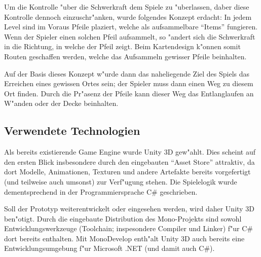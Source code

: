Um die Kontrolle "uber die Schwerkraft dem Spiele zu "uberlassen, daber diese
Kontrolle dennoch einzuschr"anken, wurde folgendes Konzept erdacht: In jedem
Level sind im Voraus Pfeile plaziert, welche als aufsammelbare ``Items''
fungieren. Wenn der Spieler einen solchen Pfeil aufsammelt, so "andert sich
die Schwerkraft in die Richtung, in welche der Pfeil zeigt. Beim Kartendesign
k"onnen somit Routen geschaffen werden, welche das Aufsammeln gewisser Pfeile
beinhalten.

Auf der Basis dieses Konzept w"urde dann das naheliegende Ziel des Spiels das
Erreichen eines gewissen Ortes sein; der Spieler muss dann einen Weg zu diesem Ort
finden. Durch die Pr"asenz der Pfeile kann dieser Weg das Entlanglaufen an
W"anden oder der Decke beinhalten.
%
\subsection{Verwendete Technologien}
\label{sec:intro/technologies}
Als bereits existierende Game Engine wurde Unity 3D gew"ahlt. Dies scheint auf
den ersten Blick insbesondere durch den eingebauten ``Asset Store'' attraktiv,
da dort Modelle, Animationen, Texturen und andere Artefakte bereits vorgefertigt
(und teilweise auch umsonst) zur Verf"ugung stehen. Die Spielelogik wurde
dementsprechend in der Programmiersprache C\# geschrieben.

Soll der Prototyp weiterentwickelt oder eingesehen werden, wird daher Unity 3D
ben"otigt. Durch die eingebaute Distribution des Mono-Projekts sind sowohl
Entwicklungswerkzeuge (Toolchain; inspesondere Compiler und Linker) f"ur C\#
dort bereits enthalten. Mit MonoDevelop enth"alt Unity 3D auch bereits eine
Entwicklungsumgebung f"ur Microsoft .NET (und damit auch C\#).
